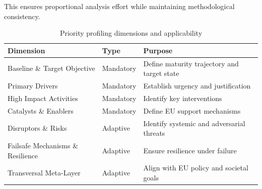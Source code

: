 \documentclass{ieeeaccess}
\begin{document}
This ensures proportional analysis effort while maintaining methodological consistency.

\begin{table}[h!]
\centering
\caption{Priority profiling dimensions and applicability}
\begin{tabular}{p{5cm} p{3cm} p{6cm}}
\toprule
\textbf{Dimension} & \textbf{Type} & \textbf{Purpose} \\
\midrule
Baseline \& Target Objective & Mandatory & Define maturity trajectory and target state \\
Primary Drivers & Mandatory & Establish urgency and justification \\
High Impact Activities & Mandatory & Identify key interventions \\
Catalysts \& Enablers & Mandatory & Define EU support mechanisms \\
Disruptors \& Risks & Adaptive & Identify systemic and adversarial threats \\
Failsafe Mechanisms \& Resilience & Adaptive & Ensure resilience under failure \\
Transversal Meta-Layer & Adaptive & Align with EU policy and societal goals \\
\bottomrule
\end{tabular}
\end{table}
\end{document}
